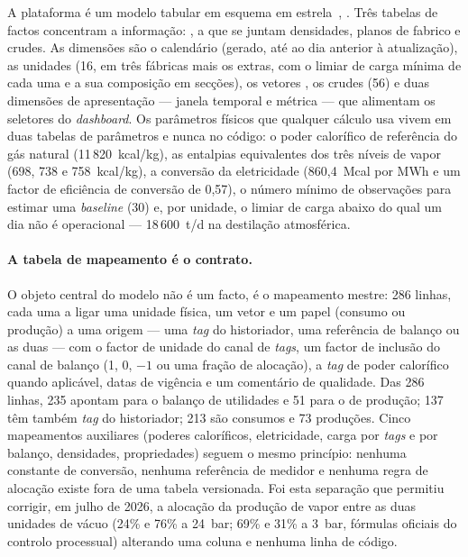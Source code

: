 A plataforma é um modelo tabular em esquema em
estrela~\cite{KimballRoss2013}, . Três tabelas de
factos concentram a informação: , a que se juntam densidades, planos
de fabrico e crudes. As dimensões são o calendário (gerado, até ao dia
anterior à atualização), as unidades (16, em três fábricas mais os
extras, com o limiar de carga mínima de cada uma e a sua composição em
secções), os vetores , os crudes
(56) e duas dimensões de apresentação --- janela temporal e métrica ---
que alimentam os seletores do \emph{dashboard}. Os parâmetros físicos que
qualquer cálculo usa vivem em duas tabelas de parâmetros e nunca no
código: o poder calorífico de referência do gás natural
(11\,820~kcal/kg), as entalpias equivalentes dos três níveis de vapor
(698, 738 e 758~kcal/kg), a conversão da eletricidade (860,4~Mcal por MWh e um
factor de eficiência de conversão de 0,57), o número mínimo de
observações para estimar uma \emph{baseline} (30) e, por unidade, o limiar
de carga abaixo do qual um dia não é operacional --- 18\,600~t/d na
destilação atmosférica.

\paragraph{A tabela de mapeamento é o contrato.} O objeto central do
modelo não é um facto, é o mapeamento mestre: 286 linhas, cada uma a
ligar uma unidade física, um vetor e um papel (consumo ou produção) a
uma origem --- uma \emph{tag} do historiador, uma referência de balanço
ou as duas --- com o factor de unidade do canal de \emph{tags}, um factor
de inclusão do canal de balanço (1, 0, $-1$ ou uma fração de alocação),
a \emph{tag} de poder calorífico quando aplicável, datas de vigência e um
comentário de qualidade. Das 286 linhas, 235 apontam para o balanço de
utilidades e 51 para o de produção; 137 têm também \emph{tag} do
historiador; 213 são consumos e 73 produções. Cinco mapeamentos auxiliares
(poderes caloríficos, eletricidade, carga por \emph{tags} e por balanço,
densidades, propriedades) seguem o mesmo princípio: nenhuma constante de
conversão, nenhuma referência de medidor e nenhuma regra de alocação
existe fora de uma tabela versionada. Foi esta separação que permitiu
corrigir, em julho de 2026, a alocação da produção de vapor entre as duas
unidades de vácuo (24\% e 76\% a 24~bar; 69\% e 31\% a 3~bar, fórmulas
oficiais do controlo processual) alterando uma coluna e nenhuma linha de
código.

